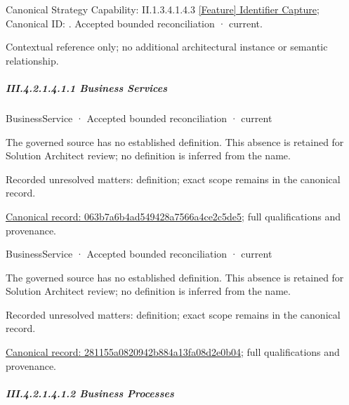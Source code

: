 {\small Canonical Strategy Capability: II.1.3.4.1.4.3 \hyperref[element:3cae3c4810974c5f8ee5a4c942f38b07]{[Feature] Identifier Capture}; Canonical ID: \texttt{}. Accepted bounded reconciliation · current.}\par
Contextual reference only; no additional architectural instance or semantic relationship.\par
\subparagraph*{III.4.2.1.4.1.1 Business Services}
\label{navigation:III.4.2.1.4.1.1}

\label{navigation:III.4.2.1.4.1.1.1}

\label{element:063b7a6b4ad549428a7566a4ce2c5de5}
{\small BusinessService · Accepted bounded reconciliation · current}\par

The governed source has no established definition. This absence is retained for Solution Architect review; no definition is inferred from the name.


{\small Recorded unresolved matters: definition; exact scope remains in the canonical record.}\par
{\footnotesize \href{../../../../continuum/business/business-service/063b7a6b4ad549428a7566a4ce2c5de5.md}{Canonical record: 063b7a6b4ad549428a7566a4ce2c5de5}; full qualifications and provenance.}\par
{}
\label{navigation:III.4.2.1.4.1.1.2}

\label{element:281155a0820942b884a13fa08d2e0b04}
{\small BusinessService · Accepted bounded reconciliation · current}\par

The governed source has no established definition. This absence is retained for Solution Architect review; no definition is inferred from the name.


{\small Recorded unresolved matters: definition; exact scope remains in the canonical record.}\par
{\footnotesize \href{../../../../continuum/business/business-service/281155a0820942b884a13fa08d2e0b04.md}{Canonical record: 281155a0820942b884a13fa08d2e0b04}; full qualifications and provenance.}\par
\subparagraph*{III.4.2.1.4.1.2 Business Processes}
\label{navigation:III.4.2.1.4.1.2}


